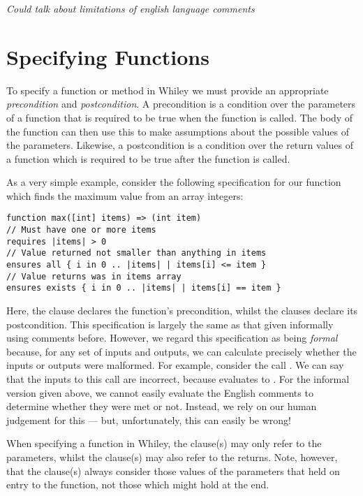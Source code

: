 {\em Could talk about limitations of english language comments}

\section{Specifying Functions}
To specify a function or method in Whiley we must provide an appropriate {\em precondition} and {\em postcondition}.  A precondition is a condition over the parameters of a function that is required to be true when the function is called.  The body of the function can then use this to make assumptions about the possible values of the parameters.  Likewise, a postcondition is a condition over the return values of a function which is required to be true after the function is called.  

\begin{eg}
As a very simple example, consider the following specification for our function which finds the maximum value from an array integers:
\begin{lstlisting}
function max([int] items) => (int item) 
// Must have one or more items
requires |items| > 0
// Value returned not smaller than anything in items
ensures all { i in 0 .. |items| | items[i] <= item }
// Value returns was in items array
ensures exists { i in 0 .. |items| | items[i] == item }
\end{lstlisting}
Here, the  clause declares the function's precondition, whilst the  clauses declare its postcondition.  This specification is largely the same as that given informally using comments before.  However, we regard this specification as being {\em formal} because, for any set of inputs and outputs, we can calculate precisely whether the inputs or outputs were malformed.  For example, consider the call .  We can say that the inputs to this call are incorrect, because  evaluates to .  For the informal version given above, we cannot easily evaluate the English comments to determine whether they were met or not.  Instead, we rely on our human judgement for this --- but, unfortunately, this can easily be wrong!
\end{eg}

When specifying a function in Whiley, the  clause(s) may only refer to the parameters, whilst the  clause(s) may also refer to the returns.  Note, however, that the  clause(s) always consider those values of the parameters that held on entry to the function, not those which might hold at the end.

